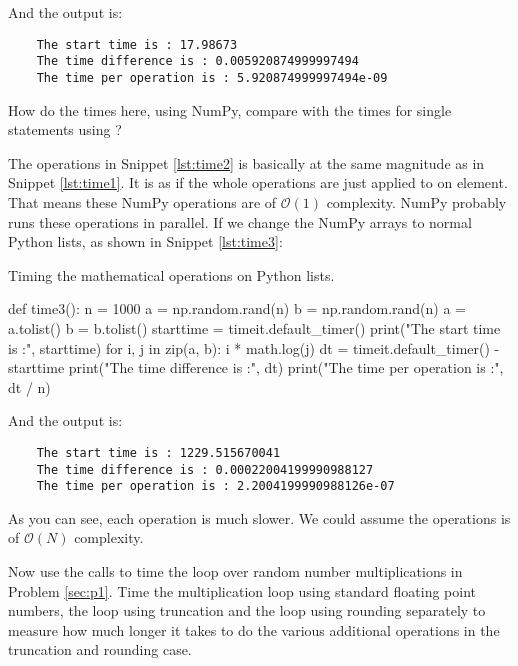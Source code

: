 And the output is:

\begin{verbatim}
    The start time is : 17.98673
    The time difference is : 0.005920874999997494
    The time per operation is : 5.920874999997494e-09
\end{verbatim}

\Question How do the times here, using NumPy, compare with the times for single
statements using ?

\Answer The operations in Snippet \ref{lst:time2} is basically at the same magnitude as
in Snippet \ref{lst:time1}. It is as if the whole operations are just applied to
on element. That means these NumPy operations are of $\mathcal{O}(1)$ complexity.
NumPy probably runs these operations in parallel.
If we change the NumPy arrays to normal Python lists, as shown in Snippet \ref{lst:time3}:

\begin{algorithm}[H]
    \caption{Timing the mathematical operations on Python lists.}
    \label{lst:time3}
    \begin{pythoncode}
        def time3():
            n = 1000
            a = np.random.rand(n)
            b = np.random.rand(n)
            a = a.tolist()
            b = b.tolist()
            starttime = timeit.default_timer()
            print("The start time is :", starttime)
            for i, j in zip(a, b):
                i * math.log(j)
            dt = timeit.default_timer() - starttime
            print("The time difference is :", dt)
            print("The time per operation is :", dt / n)
        \end{pythoncode}
\end{algorithm}

And the output is:

\begin{verbatim}
    The start time is : 1229.515670041
    The time difference is : 0.00022004199990988127
    The time per operation is : 2.2004199990988126e-07
\end{verbatim}

As you can see, each operation is much slower. We could assume the operations is
of $\mathcal{O}(N)$ complexity.

\Question Now use the  calls to time the loop over random number
multiplications in Problem \ref{sec:p1}. Time the multiplication loop using standard
floating point numbers, the loop using truncation and the loop using rounding separately to
measure how much longer it takes to do the various additional operations in the truncation
and rounding case.

